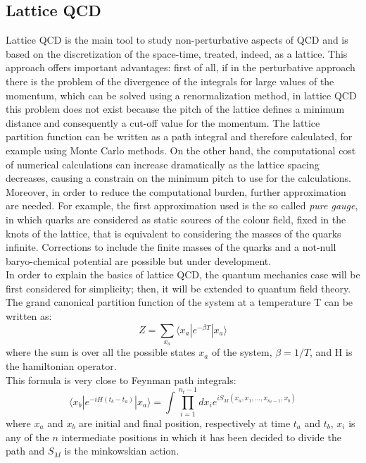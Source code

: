 \subsection{Lattice QCD}
Lattice QCD is the main tool to study non-perturbative aspects of QCD and is based on the discretization of the space-time, treated, indeed, as a lattice. This approach offers important advantages: first of all, if in the perturbative approach there is the problem of the divergence of the integrals for large values of the momentum, which can be solved using a renormalization method, in lattice QCD this problem does not exist because the pitch of the lattice defines a minimum distance and consequently a cut-off value for the momentum. The lattice partition function can be written as a path integral and therefore calculated, for example using Monte Carlo methods. On the other hand, the computational cost of numerical calculations can increase dramatically as the lattice spacing decreases, causing a constrain on the minimum pitch to use for the calculations. Moreover, in order to reduce the computational burden, further approximation are needed. For example, the first approximation used is the so called \textit{pure gauge}, in which quarks are considered as static sources of the colour field, fixed in the knots of the lattice, that is equivalent to considering the masses of the quarks infinite. Corrections to include the finite masses of the quarks and a not-null baryo-chemical potential are possible but under development.\\
In order to explain the basics of lattice QCD, the quantum mechanics case will be first considered for simplicity; then, it will be extended to quantum field theory.
The grand canonical partition function of the system at a temperature T can be written as:
%
\begin{equation}
 Z = \sum\limits_{x_{a}}\langle x_{a} | e^{-\beta T} | x_{a} \rangle
\end{equation}
%
where the sum is over all the possible states $x_{a}$ of the system, $\beta=1/T$, and H is the hamiltonian operator.\\
This formula is very close to Feynman path integrals:
%
\begin{equation}
 \langle x_{b} | e^{- i H (t_{b} - t_{a})} | x_{a} \rangle = \int \prod\limits_{i=1}^{n_{t}-1} dx_{i} e^{i S_{M}(x_{a},x_{1},\dots,x_{n_{t}-1},x_{b})}
\end{equation}
where $x_{a}$ and $x_{b}$ are initial and final position, respectively at time $t_{a}$ and  $t_{b}$, $x_{i}$ is any of the $n$ intermediate positions in which it has been decided to divide the path and $S_{M}$ is the minkowskian action.\\
